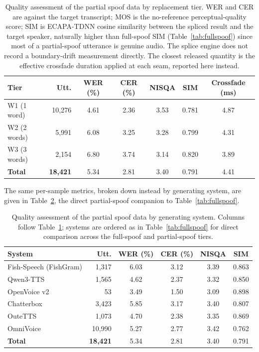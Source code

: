 \documentclass[11pt]{article}
\begin{document}
\begin{table}[H]
\centering
\caption{Quality assessment of the partial spoof data by replacement tier. WER and CER are against the target
transcript; MOS is the no-reference perceptual-quality score; SIM is
ECAPA-TDNN cosine similarity between the spliced result and the target
speaker, naturally higher than full-spoof SIM (Table~\ref{tab:fullspoof})
since most of a partial-spoof utterance is genuine audio. The splice
engine does not record a boundary-drift measurement directly. The
closest released quantity is the effective crossfade duration applied at
each seam, reported here instead.}
\label{tab:pstierquality}
\small
\begin{tabular}{lrccccc}
\toprule
\textbf{Tier} & \textbf{Utt.} & \textbf{WER (\%)} & \textbf{CER (\%)} & \textbf{NISQA} & \textbf{SIM} & \textbf{Crossfade (ms)} \\
\midrule
W1 (1 word)  & 10{,}276 & 4.61 & 2.36 & 3.53 & 0.781 & 4.87 \\
W2 (2 words) &  5{,}991 & 6.08 & 3.25 & 3.28 & 0.799 & 4.31 \\
W3 (3 words) &  2{,}154 & 6.80 & 3.74 & 3.14 & 0.820 & 3.89 \\
\midrule
\textbf{Total} & \textbf{18{,}421} & 5.34 & 2.81 & 3.40 & 0.791 & 4.41 \\
\bottomrule
\end{tabular}
\end{table}

The same per-sample metrics, broken down instead by generating system,
are given in Table~\ref{tab:pssystemquality}, the direct partial-spoof
companion to Table~\ref{tab:fullspoof}.

\begin{table}[H]
\centering
\caption{Quality assessment of the partial spoof data by generating
system. Columns follow Table~\ref{tab:pstierquality}; systems are
ordered as in Table~\ref{tab:fullspoof} for direct comparison across
the full-spoof and partial-spoof tiers.}
\label{tab:pssystemquality}
\small
\begin{tabular}{lrcccc}
\toprule
\textbf{System} & \textbf{Utt.} & \textbf{WER (\%)} & \textbf{CER (\%)} & \textbf{NISQA} & \textbf{SIM} \\
\midrule
Fish-Speech (FishGram) & 1{,}317  & 6.03 & 3.12 & 3.39 & 0.863 \\
Qwen3-TTS               & 1{,}565  & 4.62 & 2.37 & 3.32 & 0.850 \\
OpenVoice v2            &    53   & 3.49 & 1.50 & 3.09 & 0.898 \\
Chatterbox              & 3{,}423  & 5.85 & 3.17 & 3.40 & 0.807 \\
OuteTTS                 & 1{,}073  & 4.70 & 2.38 & 3.35 & 0.869 \\
OmniVoice               & 10{,}990 & 5.27 & 2.77 & 3.42 & 0.762 \\
\midrule
\textbf{Total}          & \textbf{18{,}421} & 5.34 & 2.81 & 3.40 & 0.791 \\
\bottomrule
\end{tabular}
\end{table}
\end{document}
